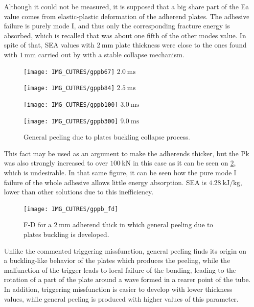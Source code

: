 \documentclass[cmfonts]{witpress}
\begin{document}
Although it could not be measured, it is supposed that a big share part of the Ea value comes from elastic-plastic deformation of the adherend plates. The adhesive failure is purely mode I, and thus only the corresponding fracture energy is absorbed, which is recalled that was about one fifth of the other modes value. In spite of that, SEA values with $\SI{2}{\mm}$ plate thickness were close to the ones found with $\SI{1}{\mm}$ carried out by \cite{Peroni2009} with a stable collapse mechanism.

\begin{figure}
	\centering
	\begin{minipage}[b]{.48\linewidth}
	\centering
	\begin{minipage}[b]{\linewidth}
		\centering
		\texttt{[image: IMG\_CUTRES/gppb67]}
		$\SI{2.0}{\ms}$
	\end{minipage}
	\quad
	\begin{minipage}[b]{\linewidth}
		\centering
		\texttt{[image: IMG\_CUTRES/gppb84]}
		$\SI{2.5}{\ms}$
	\end{minipage}
	\quad
	\begin{minipage}[b]{\linewidth}
		\centering
		\texttt{[image: IMG\_CUTRES/gppb100]}
		$\SI{3.0}{\ms}$
	\end{minipage}
	\end{minipage}
	\quad
	\begin{minipage}[b]{.48\linewidth}
		\centering
		\texttt{[image: IMG\_CUTRES/gppb300]}
		$\SI{9.0}{\ms}$
	\end{minipage}

	\caption{General peeling due to plates buckling collapse process.}
	\label{fig:gppb}
\end{figure}

This fact may be used as an argument to make the adherends thicker, but the Pk was also strongly increased to over $\SI{100}{\kN}$ in this case as it can be seen on \cref{fig:gppb_fd}, which is undesirable. In that same figure, it can be seen how the pure mode I failure of the whole adhesive allows little energy absorption. SEA is $\SI{4.28}{\kJ/\kg}$, lower than other solutions due to this inefficiency.

\begin{figure}
	\centering
	\texttt{[image: IMG\_CUTRES/gppb\_fd]}
	\caption{F-D for a $\SI{2}{\mm}$ adherend thick in which general peeling due to plates buckling is developed.}
	\label{fig:gppb_fd}
\end{figure}

Unlike the commented triggering missfunction, general peeling finds its origin on a buckling-like behavior of the plates which produces the peeling, while the malfunction of the trigger leads to local failure of the bonding, leading to the rotation of a part of the plate around a wave formed in a rearer point of the tube. In addition, triggering missfunction is easier to develop with lower thickness values, while general peeling is produced with higher values of this parameter.
\end{document}
